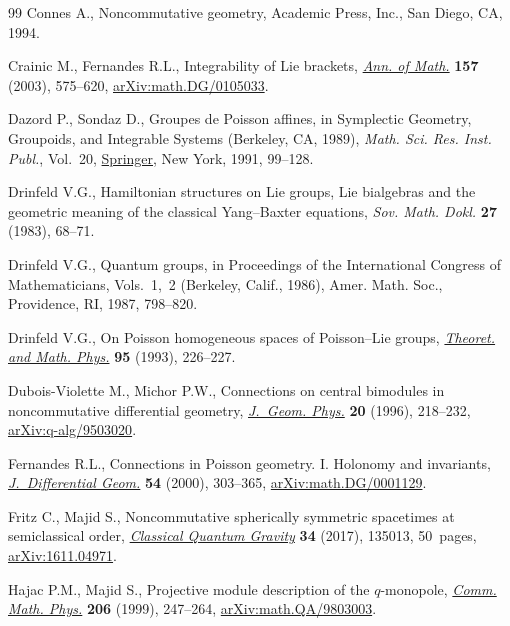 \documentclass[10pt,a4paper]{amsart}
\numberwithin{equation}{section}
\newcommand{\<}{{\langle}}
\renewcommand{\>}{{\rangle}}
\begin{document}
\begin{thebibliography}{99}
Connes A., Noncommutative geometry, Academic Press, Inc., San Diego, CA, 1994.

Crainic M., Fernandes R.L., Integrability of {L}ie brackets, \href{https://doi.org/10.4007/annals.2003.157.575}{\textit{Ann. of
 Math.}} \textbf{157} (2003), 575--620, \href{https://arxiv.org/abs/math.DG/0105033}{arXiv:math.DG/0105033}.

Dazord P., Sondaz D., Groupes de {P}oisson affines, in Symplectic Geometry,
 Groupoids, and Integrable Systems ({B}erkeley, {CA}, 1989), \textit{Math.
 Sci. Res. Inst. Publ.}, Vol.~20, \href{https://doi.org/10.1007/978-1-4613-9719-9_6}{Springer}, New York, 1991, 99--128.

Drinfeld V.G., Hamiltonian structures on {L}ie groups, {L}ie bialgebras and the
 geometric meaning of the classical {Y}ang--{B}axter equations, \textit{Sov.
 Math. Dokl.} \textbf{27} (1983), 68--71.

Drinfeld V.G., Quantum groups, in Proceedings of the {I}nternational {C}ongress
 of {M}athematicians, {V}ols.~1,~2 ({B}erkeley, {C}alif., 1986), Amer. Math.
 Soc., Providence, RI, 1987, 798--820.

Drinfeld V.G., On {P}oisson homogeneous spaces of {P}oisson--{L}ie groups,
 \href{https://doi.org/10.1007/BF01017137}{\textit{Theoret. and Math. Phys.}} \textbf{95} (1993), 226--227.

Dubois-Violette M., Michor P.W., Connections on central bimodules in
 noncommutative differential geo\-met\-ry, \href{https://doi.org/10.1016/0393-0440(95)00057-7}{\textit{J.~Geom. Phys.}} \textbf{20}
 (1996), 218--232, \href{https://arxiv.org/abs/q-alg/9503020}{arXiv:q-alg/9503020}.

Fernandes R.L., Connections in {P}oisson geometry. {I}. {H}olonomy and
 invariants, \href{https://doi.org/10.4310/jdg/1214341648}{\textit{J.~Differential Geom.}} \textbf{54} (2000), 303--365,
 \href{https://arxiv.org/abs/math.DG/0001129}{arXiv:math.DG/0001129}.

Fritz C., Majid S., Noncommutative spherically symmetric spacetimes at
 semiclassical order, \href{https://doi.org/10.1088/1361-6382/aa72a5}{\textit{Classical Quantum Gravity}} \textbf{34} (2017),
 135013, 50~pages, \href{https://arxiv.org/abs/1611.04971}{arXiv:1611.04971}.

Hajac P.M., Majid S., Projective module description of the {$q$}-monopole,
 \href{https://doi.org/10.1007/s002200050704}{\textit{Comm. Math. Phys.}} \textbf{206} (1999), 247--264,
 \href{https://arxiv.org/abs/math.QA/9803003}{arXiv:math.QA/9803003}.


\end{thebibliography}
\end{document}
